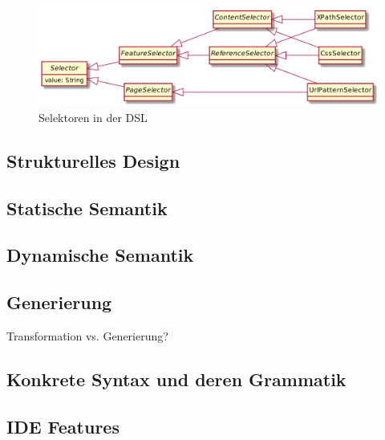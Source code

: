         \begin{figure}[htb]
            \centering
            \includegraphics[width=\textwidth]{../resources/dsl/selectors.png}
            \caption{Selektoren in der DSL}
            \label{image:dslSelektoren}
        \end{figure}

    \subsection{Strukturelles Design}
    \subsection{Statische Semantik}
    \subsection{Dynamische Semantik}
    \subsection{Generierung}
        Transformation vs. Generierung?
        
        
        

    \subsection{Konkrete Syntax und deren Grammatik}
            
        
        
        

    \subsection{IDE Features}
